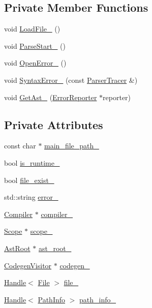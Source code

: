 \subsection*{Private Member Functions}
\begin{DoxyCompactItemize}
\item 
void \hyperlink{classmocha_1_1_internal_a935af598d7d3988d6e2deb3ef4b9f371}{LoadFile\_\-} ()
\item 
void \hyperlink{classmocha_1_1_internal_afe4d564afd28de8cbf4c8ea1a035184c}{ParseStart\_\-} ()
\item 
void \hyperlink{classmocha_1_1_internal_a100899a751add395e56a52991462d30b}{OpenError\_\-} ()
\item 
void \hyperlink{classmocha_1_1_internal_a05c0e0b84386af93e8eb1e889f65fecb}{SyntaxError\_\-} (const \hyperlink{classmocha_1_1_parser_tracer}{ParserTracer} \&)
\item 
void \hyperlink{classmocha_1_1_internal_a4fd370840628cdc6fa30a41b458d48ef}{GetAst\_\-} (\hyperlink{classmocha_1_1_error_reporter}{ErrorReporter} $\ast$reporter)
\end{DoxyCompactItemize}
\subsection*{Private Attributes}
\begin{DoxyCompactItemize}
\item 
const char $\ast$ \hyperlink{classmocha_1_1_internal_a078269b0ed348d8581f3acdae618e394}{main\_\-file\_\-path\_\-}
\item 
bool \hyperlink{classmocha_1_1_internal_a0e4225ddc86465d35cdef3dac4211df1}{is\_\-runtime\_\-}
\item 
bool \hyperlink{classmocha_1_1_internal_aee7ebdb2e4620bc81cb165d6d966c369}{file\_\-exist\_\-}
\item 
std::string \hyperlink{classmocha_1_1_internal_ac701005cf899132836fe980a64715353}{error\_\-}
\item 
\hyperlink{classmocha_1_1_compiler}{Compiler} $\ast$ \hyperlink{classmocha_1_1_internal_ae20e32b51b17a60782e14bfbd5eddf93}{compiler\_\-}
\item 
\hyperlink{classmocha_1_1_scope}{Scope} $\ast$ \hyperlink{classmocha_1_1_internal_af9c954ecf5256edb08ab163ecf8bc967}{scope\_\-}
\item 
\hyperlink{classmocha_1_1_ast_root}{AstRoot} $\ast$ \hyperlink{classmocha_1_1_internal_a630d9b1bf103a3279a78d1ef7e26df2e}{ast\_\-root\_\-}
\item 
\hyperlink{classmocha_1_1_codegen_visitor}{CodegenVisitor} $\ast$ \hyperlink{classmocha_1_1_internal_acf64e190f1b015f35a55ba6c4be188d0}{codegen\_\-}
\item 
\hyperlink{classmocha_1_1_handle}{Handle}$<$ \hyperlink{classmocha_1_1_file}{File} $>$ \hyperlink{classmocha_1_1_internal_af70a5ac87611f52380bbe0e7da0c7d99}{file\_\-}
\item 
\hyperlink{classmocha_1_1_handle}{Handle}$<$ \hyperlink{classmocha_1_1_path_info}{PathInfo} $>$ \hyperlink{classmocha_1_1_internal_a3ad557772e8614820d6755ae0eb1aa77}{path\_\-info\_\-}
\end{DoxyCompactItemize}


